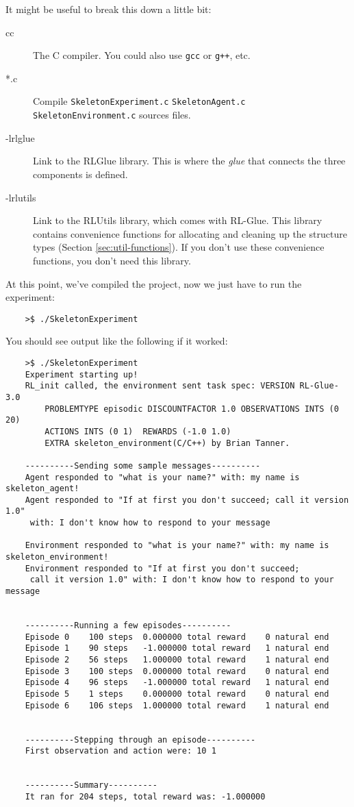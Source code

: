 \documentclass[11pt]{article}
\begin{document}
It might be useful to break this down a little bit:
\begin{description}
\item [cc] The C compiler.  You could also use \texttt{gcc} or \texttt{g++}, etc.
\item [*.c] Compile \texttt{SkeletonExperiment.c} \texttt{SkeletonAgent.c} \texttt{SkeletonEnvironment.c} sources files.
\item [-lrlglue] Link to the RLGlue library.  This is where the \textit{glue} that connects the three components is defined.
\item [-lrlutils] Link to the RLUtils library, which comes with RL-Glue.  This library contains convenience functions for allocating and cleaning up the structure types (Section \ref{sec:util-functions}).  If you 
don't use these convenience functions, you don't need this library.
\end{description}


At this point, we've compiled the project, now we just have to run the experiment:
\begin{verbatim}
	>$ ./SkeletonExperiment
\end{verbatim}

You should see output like the following if it worked:
\begin{verbatim}
	>$ ./SkeletonExperiment
	Experiment starting up!
	RL_init called, the environment sent task spec: VERSION RL-Glue-3.0 
		PROBLEMTYPE episodic DISCOUNTFACTOR 1.0 OBSERVATIONS INTS (0 20) 
		ACTIONS INTS (0 1)  REWARDS (-1.0 1.0)  
		EXTRA skeleton_environment(C/C++) by Brian Tanner.

	----------Sending some sample messages----------
	Agent responded to "what is your name?" with: my name is skeleton_agent!
	Agent responded to "If at first you don't succeed; call it version 1.0"
	 with: I don't know how to respond to your message

	Environment responded to "what is your name?" with: my name is skeleton_environment!
	Environment responded to "If at first you don't succeed;
	 call it version 1.0" with: I don't know how to respond to your message


	----------Running a few episodes----------
	Episode 0	 100 steps 	0.000000 total reward	 0 natural end 
	Episode 1	 90 steps 	-1.000000 total reward	 1 natural end 
	Episode 2	 56 steps 	1.000000 total reward	 1 natural end 
	Episode 3	 100 steps 	0.000000 total reward	 0 natural end 
	Episode 4	 96 steps 	-1.000000 total reward	 1 natural end 
	Episode 5	 1 steps 	0.000000 total reward	 0 natural end 
	Episode 6	 106 steps 	1.000000 total reward	 1 natural end 


	----------Stepping through an episode----------
	First observation and action were: 10 1


	----------Summary----------
	It ran for 204 steps, total reward was: -1.000000
\end{verbatim}
\end{document}
